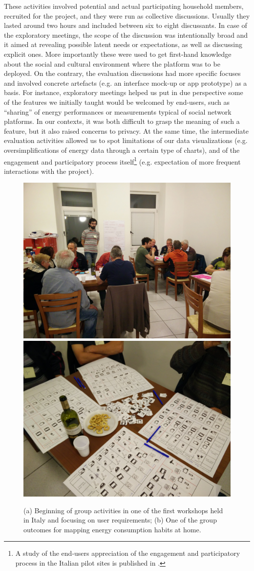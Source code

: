 These activities involved potential and actual participating household members, recruited for the project, and they
were run as collective discussions. Usually they lasted around two hours and included between six to eight discussants.
In case of the exploratory meetings, the scope of the discussion was intentionally broad and it aimed at revealing possible latent
needs or expectations, as well as discussing explicit ones. More importantly these were used to get first-hand knowledge
about the social and cultural environment where the platform was to be deployed. On the contrary, the evaluation discussions
had more specific focuses and involved concrete artefacts (e.g. an interface mock-up or app prototype)
as a basis.
% 
For instance, exploratory meetings helped us put in due perspective some of the features we initially taught
would be welcomed by end-users, such as ``sharing'' of energy performances or measurements typical of social network platforms.
In our contexts, it was both difficult to grasp the meaning of such a feature, but it also raised
 concerns to privacy. At the same time, the intermediate evaluation activities allowed us to spot
limitations of our data visualizations (e.g. oversimplifications of energy data through a certain type of charts),
and of the engagement and participatory process itself\footnote{A study of the end-users appreciation of the engagement and participatory process in the Italian pilot sites
is published in \cite{capaccioli_exploring_2017}.}
(e.g. expectation of more frequent interactions with the project).


\begin{figure}
      	\sidecaption[t]
        \includegraphics[width=.32\linewidth]{img/Workshop_userreq1.jpg}
	        \includegraphics[width=.32\linewidth]{img/Workshop_userreq2.jpg} 
    \caption{(a) Beginning of group activities in one of the first workshops held in Italy and focusing
    on user requirements; (b) One of the group outcomes for mapping energy consumption habits at home. 
}
\label{fig:workshops}
\end{figure}

